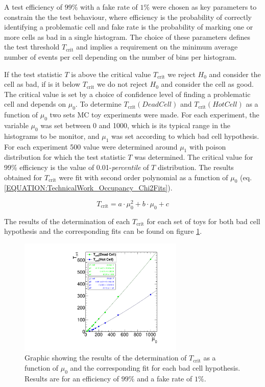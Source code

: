 A test efficiency of $99\%$ with a fake rate of $1\%$ were chosen as key parameters to constrain the the test behaviour, where efficiency is the probability of correctly identifying a problematic cell and fake rate is the probability of marking one or more cells as bad in a single histogram. The choice of these parameters defines the test threshold $T_{\text{crit}}$ and implies a requirement on the minimum average number of events per cell depending on the number of bins per histogram.

If the test statistic $T$ is above the critical value $T_{\text{crit}}$ we reject $H_0$ and consider the cell as bad, if is it below $T_{\text{crit}}$ we do not reject $H_0$ and consider the cell as good. The critical value is set by a choice of confidence level of finding a problematic cell and depends on $\mu_0$. To determine $T_{\text{crit}}(Dead Cell)$ and $T_{\text{crit}}(Hot Cell)$ as a function of $\mu_0$ two sets \gls{MC} toy experiments were made. For each experiment, the variable $\mu_0$ was set between 0 and 1000, which is its typical range in the histograms to be monitor, and $\mu_1$ was set according to which bad cell hypothesis. For each experiment 500 value were determined around $\mu_1$ with poison distribution for which the test statistic $T$ was determined. The critical value for 99\% efficiency is the value of 0.01-\textit{percentile} of $T$ distribution. The results obtained for $T_{\text{crit}}$ were fit with second order polynomial as a function of $\mu_0$ (eq. \ref{EQUATION:TechnicalWork_Occupancy_Chi2Fits}).

\begin{equation}
T_{\text{crit}}=a \cdot \mu_0^2 + b \cdot \mu_0 + c
\label{EQUATION:TechnicalWork_Occupancy_Chi2Fits}
\end{equation}

The results of the determination of each $T_{\text{crit}}$ for each set of toys for both bad cell hypothesis and the corresponding fits can be found on figure \ref{FIGURE:TechnicalWork_L1TOccupancyTCrit}.

\begin{figure}[!htb]
\centering
\includegraphics[width=0.70\textwidth]{Chapter03/L1TOnline/Images/L1TOccupancy_TCrit.pdf}
\caption{Graphic showing the results of the determination of $T_{\text{crit}}$ as a function of $\mu_0$ and the corresponding fit for each bad cell hypothesis. Results are for an efficiency of $99\%$ and a fake rate of $1\%$.}
\label{FIGURE:TechnicalWork_L1TOccupancyTCrit}
\end{figure}

